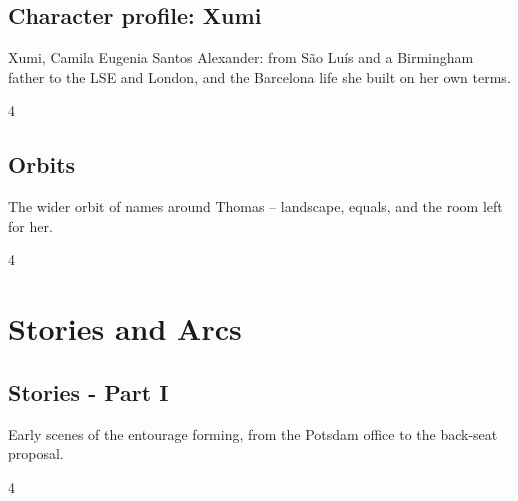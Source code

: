 \documentclass[a4paper,landscape]{memoir}
\begin{document}
\chapter{Character profile: Xumi}
Xumi, Camila Eugenia Santos Alexander: from São Luís and a Birmingham father to the LSE and London, %
and the Barcelona life she built on her own terms.
\clearpage\begin{multicols*}{4}













\end{multicols*}

\chapter{Orbits}
The wider orbit of names around Thomas -- landscape, equals, and the room left for her.
\clearpage\begin{multicols*}{4}












\end{multicols*}

\part{Stories and Arcs}
\chapter{Stories - Part I}
Early scenes of the entourage forming, from the Potsdam office to the back-seat proposal.
\clearpage\begin{multicols*}{4}
\end{multicols*}
\end{document}
